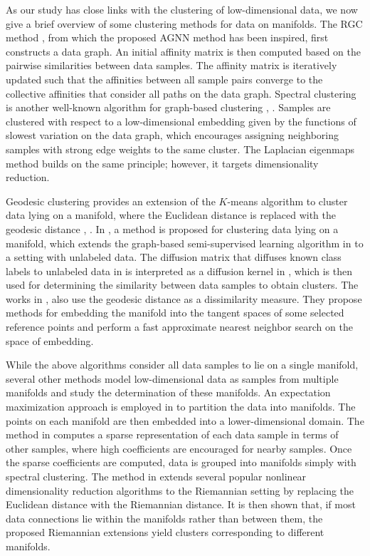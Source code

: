 \documentclass[journal]{IEEEtran}
\begin{document}
As our study has close links with the clustering of low-dimensional data, we now give a brief overview of some clustering methods for data on manifolds. 
The RGC method \cite{Donoser13replicator}, from which the proposed AGNN method has been inspired, first constructs a data graph. An initial affinity matrix is then computed based on the pairwise similarities between data samples. The affinity matrix is iteratively updated such that the affinities between all sample pairs converge to the collective affinities that consider all paths on the data graph. 
Spectral clustering is another well-known algorithm for graph-based clustering  \cite{Shi00normalized}, \cite{Uw01on}. Samples are clustered with respect to a low-dimensional embedding given by the functions of slowest variation on the data graph, which encourages assigning neighboring samples with strong edge weights to the same cluster. The Laplacian eigenmaps method \cite{Belkin03laplacian} builds on the same principle; however, it targets dimensionality reduction. 

Geodesic clustering provides an extension of the $K$-means algorithm to cluster data lying on a manifold, where the Euclidean distance is replaced with the geodesic distance \cite{Asgharbeygi2008}, \cite{Tu2014}. In \cite{Breitenbach2005}, a method is proposed for clustering data lying on a manifold, which extends the graph-based  semi-supervised learning algorithm in \cite{Zhou2004} to a setting with unlabeled data. The diffusion matrix that diffuses known class labels to unlabeled data in \cite{Zhou2004} is interpreted as a diffusion kernel in \cite{Breitenbach2005}, which is then used for determining the similarity between data samples to obtain clusters. The works in \cite{Turaga10nearest}, \cite{Chaudhry10fast} also use the geodesic distance as a dissimilarity measure. They propose methods for embedding the manifold into the tangent spaces of some selected reference points and perform a fast approximate nearest neighbor search on the space of embedding. 


While the above algorithms consider all data samples to lie on a single manifold, several other methods model low-dimensional data as samples from multiple manifolds and study the determination of these manifolds. An expectation maximization approach is employed in \cite{Souvenir2005} to partition the data into manifolds. The points on each manifold are then embedded into a lower-dimensional domain. The method in \cite{Elhamifar2011} computes a sparse representation of each data sample in terms of other samples, where high coefficients are encouraged for nearby samples. Once the sparse coefficients are computed, data is grouped into manifolds simply with spectral clustering. The method in \cite{Goh2008} extends several popular nonlinear dimensionality reduction algorithms to the Riemannian setting by replacing the Euclidean distance with the Riemannian distance. It is then shown that, if most data connections lie within the manifolds rather than between them, the proposed Riemannian extensions yield clusters corresponding to different manifolds. 
\end{document}
